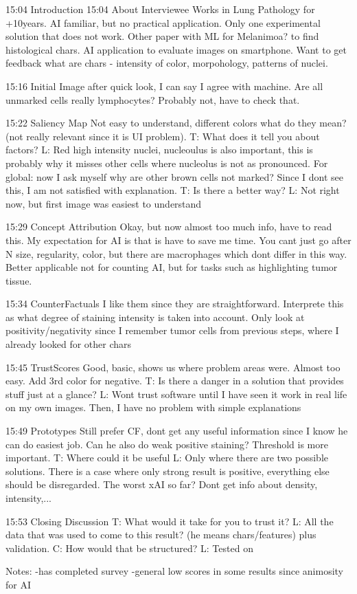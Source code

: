  15:04 Introduction
 15:04 About Interviewee
 Works in Lung Pathology for +10years. AI familiar, but no practical application. Only one experimental solution that does not work. 
 Other paper with ML for Melanimoa? to find histological chars. AI application to evaluate images on smartphone. Want to get feedback what are chars - intensity of color, morpohology, patterns of nuclei.
 
 15:16 Initial Image
 after quick look, I can say I agree with machine. Are all unmarked cells really lymphocytes? Probably not, have to check that. 
 
 15:22 Saliency Map
 Not easy to understand, different colors what do they mean? (not really relevant since it is UI problem). T: What does it tell you about factors? L: Red high intensity nuclei, nucleoulus is also important, this is probably why it
 misses other cells where nucleolus is not as pronounced.
 For global: now I ask myself why are other brown cells not marked? Since I dont see this, I am not satisfied with explanation. 
 T: Is there a better way? L: Not right now, but first image was easiest to understand
 
 15:29 Concept Attribution
 Okay, but now almost too much info, have to read this. My expectation for AI is that is have to save me time. You cant just go after N size, regularity, color, but there are macrophages which dont differ in this way.
 Better applicable not for counting AI, but for tasks such as highlighting tumor tissue.
 
 15:34 CounterFactuals
 I like them since they are straightforward. Interprete this as what degree of staining intensity is taken into account. Only look at positivity/negativity since I remember tumor cells from previous steps, where I already looked for
 other chars 
 
 15:45 TrustScores
 Good, basic, shows us where problem areas were. Almost too easy. Add 3rd color for negative. T: Is there a danger in a solution that provides stuff just at a glance? L: Wont trust software until I have seen it work
 in real life on my own images. Then, I have no problem with simple explanations
 
 15:49 Prototypes
 Still prefer CF, dont get any useful information since I know he can do easiest job. Can he also do weak positive staining? Threshold is more important. T: Where could it be useful L: Only where there are two possible solutions.
 There is a case where only strong result is positive, everything else should be disregarded. The worst xAI so far? Dont get info about density, intensity,... 
 
 15:53 Closing Discussion
 T: What would it take for you to trust it? L: All the data that was used to come to this result? (he means chars/features) plus validation.  C: How would that be structured?
 L: Tested on 
 
 Notes:
 -has completed survey
 -general low scores in some results since animosity for AI